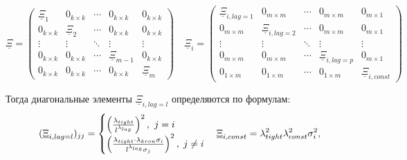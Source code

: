 \documentclass[11pt]{article} %
\newcommand{\prior}{\underline}
\begin{document}

\begin{equation*}
\prior \Xi=\begin{pmatrix}
\prior \Xi_1&0_{k\times k}&\cdots&0_{k\times k}&0_{k\times k}\\
0_{k\times k}& \prior \Xi_2& \cdots &0_{k\times k}&0_{k\times k}\\
\vdots &\vdots& \ddots&\vdots& \vdots\\
0_{k\times k}&0_{k\times k}&\cdots&\prior\Xi_{m-1} & 0_{k\times k}\\
0_{k\times k}&0_{k\times k}&\cdots&0_{k\times k}&\prior \Xi_m
\end{pmatrix}
\quad
\prior \Xi_i=\begin{pmatrix}
\prior \Xi_{i,lag=1}&0_{m\times m}&\cdots&0_{m\times m}&0_{m\times 1}\\
0_{m\times m}& \prior \Xi_{i,lag=2}& \cdots &0_{m\times m}&0_{m\times 1}\\
\vdots &\vdots& \ddots& \vdots&\vdots\\
0_{m\times m}&0_{m\times m}&\cdots&\prior \Xi_{i,lag=p}&0_{m\times 1}\\
0_{1\times m}&0_{1\times m}&\cdots&0_{1\times m}&\prior \Xi_{i,const}
\end{pmatrix}
\end{equation*}

Тогда  диагональные элементы  $\prior \Xi_{i,lag=l}$ определяются по формулам:
\begin{equation}
(\prior \Xi_{i,lag=l})_{jj}
=\begin{cases}
\left(\frac{\lambda_{tight}}{l^{\lambda_{lag}}}\right)^2,\ j=i\\
\left(\frac{\lambda_{tight}\cdot\lambda_{kron}\sigma_i}{l^{\lambda_{lag}}\sigma_j}\right)^2, \; j\ne i
\end{cases}\\
\prior \Xi_{i,const}
=\lambda_{tight}^2\lambda_{const}^2\sigma_i^2,
\label{minnesota_variance}
\end{equation}

\end{document}
